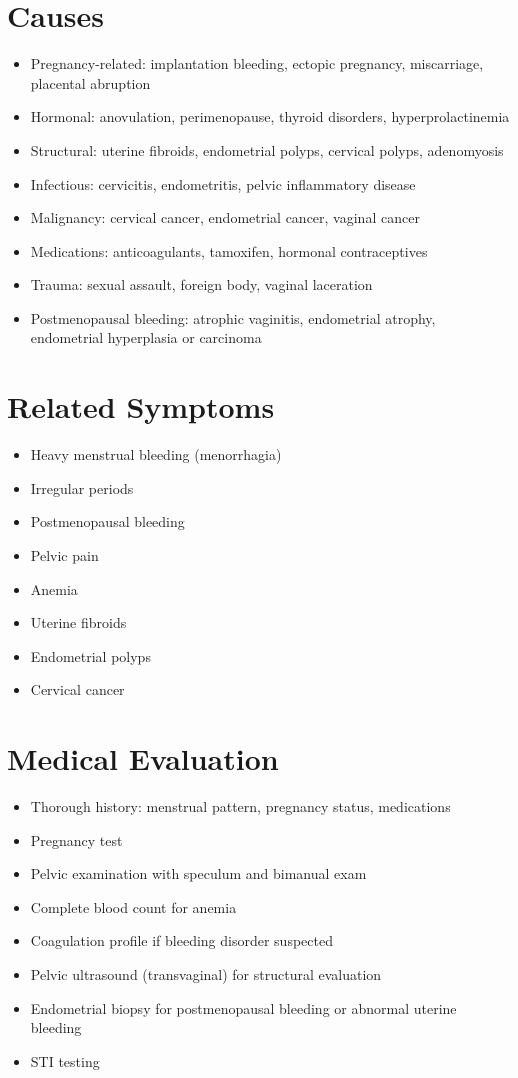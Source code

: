 \section*{Causes}
\begin{itemize}
\item Pregnancy-related: implantation bleeding, ectopic pregnancy, miscarriage, placental abruption
\item Hormonal: anovulation, perimenopause, thyroid disorders, hyperprolactinemia
\item Structural: uterine fibroids, endometrial polyps, cervical polyps, adenomyosis
\item Infectious: cervicitis, endometritis, pelvic inflammatory disease
\item Malignancy: cervical cancer, endometrial cancer, vaginal cancer
\item Medications: anticoagulants, tamoxifen, hormonal contraceptives
\item Trauma: sexual assault, foreign body, vaginal laceration
\item Postmenopausal bleeding: atrophic vaginitis, endometrial atrophy, endometrial hyperplasia or carcinoma
\end{itemize}

\section*{Related Symptoms}
\begin{itemize}
\item Heavy menstrual bleeding (menorrhagia)
\item Irregular periods
\item Postmenopausal bleeding
\item Pelvic pain
\item Anemia
\item Uterine fibroids
\item Endometrial polyps
\item Cervical cancer
\end{itemize}

\section*{Medical Evaluation}
\begin{itemize}
\item Thorough history: menstrual pattern, pregnancy status, medications
\item Pregnancy test
\item Pelvic examination with speculum and bimanual exam
\item Complete blood count for anemia
\item Coagulation profile if bleeding disorder suspected
\item Pelvic ultrasound (transvaginal) for structural evaluation
\item Endometrial biopsy for postmenopausal bleeding or abnormal uterine bleeding
\item STI testing
\end{itemize}

